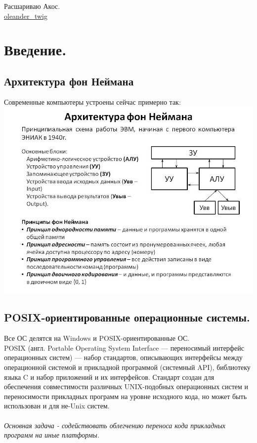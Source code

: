 \documentclass[12pt]{article}
\begin{document}
\begin{center}
Расшариваю Акос. \\
\textcolor{blue}{\href{https://t.me/oleander_twig}{oleander\_twig}}
\end{center}

\tableofcontents
\section{Введение.}

\subsection{Архитектура фон Неймана}
Современные компьютеры устроены сейчас примерно так: \\
\includegraphics[scale=0.5]{./004.png} \\

\subsection{POSIX-ориентированные операционные системы.}
Все ОС делятся на Windows и POSIX-ориентированные ОС. \\
POSIX (англ. Portable Operating System Interface — переносимый интерфейс операционных систем) — набор стандартов, описывающих интерфейсы между операционной системой и прикладной программой (системный API), библиотеку языка C и набор приложений и их интерфейсов. Стандарт создан для обеспечения совместимости различных UNIX-подобных операционных систем и переносимости прикладных программ на уровне исходного кода, но может быть использован и для не-Unix систем. \\
\\
\sl Основная задача - содействовать облегчению переноса кода прикладных программ на иные платформы. \\
\end{document}
